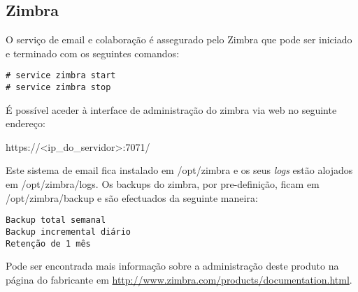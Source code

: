 \subsection{Zimbra}

O serviço de email e colaboração é assegurado pelo Zimbra que pode ser iniciado e terminado com os seguintes comandos:

\begin{verbatim}
# service zimbra start
# service zimbra stop
\end{verbatim}

É possível aceder à interface de administração do zimbra via web no seguinte endereço:

https://<ip\_do\_servidor>:7071/

Este sistema de email fica instalado em /opt/zimbra e os seus \emph{logs} estão alojados em /opt/zimbra/logs.
Os backups do zimbra, por pre-definição, ficam em /opt/zimbra/backup e são efectuados da seguinte maneira:

\begin{verbatim}
Backup total semanal
Backup incremental diário
Retenção de 1 mês
\end{verbatim}

Pode ser encontrada mais informação sobre a administração deste produto na página do fabricante em \url{http://www.zimbra.com/products/documentation.html}.

